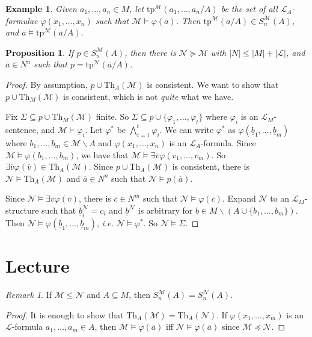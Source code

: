 \documentclass[]{article}
\theoremstyle{custhm}
\theoremstyle{cusdef}
\theoremstyle{custhm}
\theoremstyle{custhm}
\theoremstyle{custhm}
\newtheorem{prop}[theorem]{Proposition}
\theoremstyle{ex}
\newtheorem{ex}[theorem]{Example}
\theoremstyle{custhm}
\theoremstyle{cusdef}
\theoremstyle{remark}
\theoremstyle{remark}
\theoremstyle{numremark}
\newtheorem{numremark}[theorem]{Remark}
\renewcommand{\L}{\mathcal{L}}
\renewcommand{\it}[1]{\textit{#1}}
\newcommand{\M}{\mathcal{M}}
\renewcommand{\phi}{\varphi}
\renewcommand{\bar}{\overline}
\newcommand{\Th}{\textrm{Th}}
\newcommand{\tp}{\textrm{tp}}
\newcommand{\N}{\mathcal{N}}
\renewcommand{\subset}{\subseteq}
\begin{document}
\begin{ex}
Given $a_1,\dots,a_n\in M$, let $\textrm{tp}^\M(a_1,\dots,a_n/A)$ be the set of all $\L_A$-formulae $\phi(x_1,\dots,x_n)$ such that $\M\models \phi(\bar{a})$. Then $\tp^\M(\bar{a}/A)\in S_n^\M(A)$, and $\bar{a}\models \tp^\M(\bar{a}/A)$.
\end{ex}
\begin{prop}
If $p \in S_n^\M(A)$, then there is $\N\succeq\M$ with $|N| \le |M| + |\L|$, and $\bar{a}\in N^n$ such that $p = \tp^\N(\bar{a}/A)$.
\end{prop}
\begin{proof}
By assumption, $p\cup\Th_A(\M)$ is consistent. We want to show that $p \cup \Th_M(\M)$ is consistent, which is not \it{quite} what we have.

Fix $\Sigma \subset p \cup \Th_M(\M)$ finite. So $\Sigma \subset p \cup \{\phi_1,\dots,\phi_t\}$ where $\phi_i$ is an $\L_M$-sentence, and $\M\models \phi_i$. Let $\phi^\ast$ be $\bigwedge_{i=1}^{t}\phi_i$. We can write $\phi^\ast$ as $\phi(\underline{b}_1,\dots,\underline{b}_m)$ where $b_1,\dots,b_m\in \M\backslash A$ and $\phi(x_1,\dots,x_n)$ is an $\L_A$-formula. Since $\M\models \phi(b_1,\dots,b_m)$, we have that $\M\models \exists \bar{v}\phi(v_1,\dots,v_m)$. So $\exists \bar{v}\phi(\bar{v})\in \Th_A(\M)$. Since $p\cup \Th_A(\M)$ is consistent, there is $\N\models \Th_A(\M)$ and $\bar{a} \in N^n$ such that $\N\models p(\bar{a})$.

Since $\N\models \exists \bar{v}\phi(\bar{v})$, there is $\bar{c} \in N^m$ such that $\N\models \phi(\bar{c})$. Expand $\N$ to an $\L_M$-structure such that $\underline{b}_i^\N = c_i$ and $\underline{b}^\N$ is arbitrary for $b\in M\backslash (A\cup \{b_1,\dots,b_m\})$. Then $\N\models \phi(\underline{b}_1,\dots,\underline{b}_m)$, \it{i.e.} $\N\models \phi^\ast$. So $\N\models \Sigma$.
\end{proof}


\section{Lecture}

\begin{numremark}
If $\M\le \N$ and $A \subset M$, then $S_n^\M(A) = S_n^\N(A)$.
\end{numremark}
\begin{proof}
It is enough to show that $\Th_A(\M) = \Th_A(\N)$. If $\phi(x_1,\dots,x_m)$ is an $\L$-formula $a_1,\dots,a_m\in A$, then $\M\models \phi(\bar{a})$ iff $\N\models \phi(\bar{a})$ since $\M\preceq \N$.
\end{proof}
\end{document}
